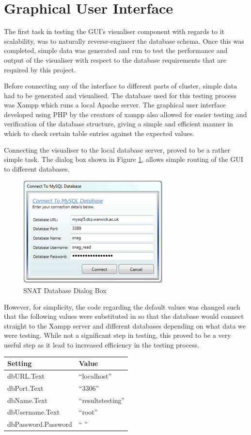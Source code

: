 \section{Graphical User Interface}
The first task in testing the GUI's visualiser component with regards to it scalability, was to naturally reverse-engineer the database schema. Once this was completed, simple data was generated and run to test the performance and output of the visualiser with respect to the database requirements that are required by this project. 

Before connecting any of the interface to different parts of cluster, simple data had to be generated and visualised. The database used for this testing process was Xampp which runs a local Apache server. The graphical user interface developed using PHP by the creators of xampp also allowed for easier testing and verification of the database structure, giving a simple and efficient manner in which to check certain table entries against the expected values.

Connecting the visualiser to the local database server, proved to be a rather simple task. The dialog box shown in Figure \ref{fig:mysql}, allows simple routing of the GUI to different databases. 

\begin{figure}[htbp]%
\centering
\includegraphics[width=0.5\columnwidth]{./img/mysql}%
\caption{SNAT Database Dialog Box}%
\label{fig:mysql}%
\end{figure}

However, for simplicity, the code regarding the default values was changed such that the following values were substituted in so that the database would connect straight to the Xampp server and different databases depending on what data we were testing. While not a significant step in testing, this proved to be a very useful step as it lead to increased efficiency in the testing process.

\begin{table}[htbp]%
\centering
\begin{tabular}{l|l}
Setting & Value \\
\hline
dbURL.Text & ``localhost'' \\
dbPort.Text & ``3306'' \\
dbName.Text & ``resultstesting'' \\
dbUsername.Text & ``root'' \\
dbPassword.Password & `` '' \\
\end{tabular}
\end{table}

